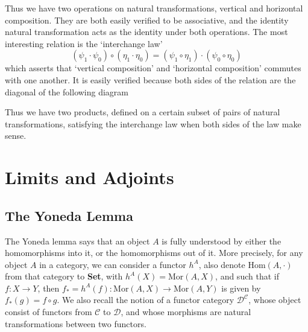 Thus we have two operations on natural transformations, vertical and horizontal composition. They are both easily verified to be associative, and the identity natural transformation acts as the identity under both operations. The most interesting relation is the `interchange law'
%
\[ (\psi_1 \cdot \psi_0) \circ (\eta_1 \cdot \eta_0) = (\psi_1 \circ \eta_1) \cdot (\psi_0 \circ \eta_0) \]
%
which asserts that `vertical composition' and `horizontal composition' commutes with one another. It is easily verified because both sides of the relation are the diagonal of the following diagram
%
\begin{center}
\end{center}
%
Thus we have two products, defined on a certain subset of pairs of natural transformations, satisfying the interchange law when both sides of the law make sense. 



\chapter{Limits and Adjoints}


\section{The Yoneda Lemma}

The Yoneda lemma says that an object $A$ is fully understood by either the homomorphisms into it, or the homomorphisms out of it. More precisely, for any object $A$ in a category, we can consider a functor $h^A$, also denote $\text{Hom}(A,\cdot)$ from that category to {\bf Set}, with $h^A(X) = \text{Mor}(A,X)$, and such that if $f: X \to Y$, then $f_* = h^A(f): \text{Mor}(A,X) \to \text{Mor}(A,Y)$ is given by $f_*(g) = f \circ g$. We also recall the notion of a functor category $\mathcal{D}^{\mathcal{C}}$, whose object consist of functors from $\mathcal{C}$ to $\mathcal{D}$, and whose morphisms are natural transformations between two functors.

